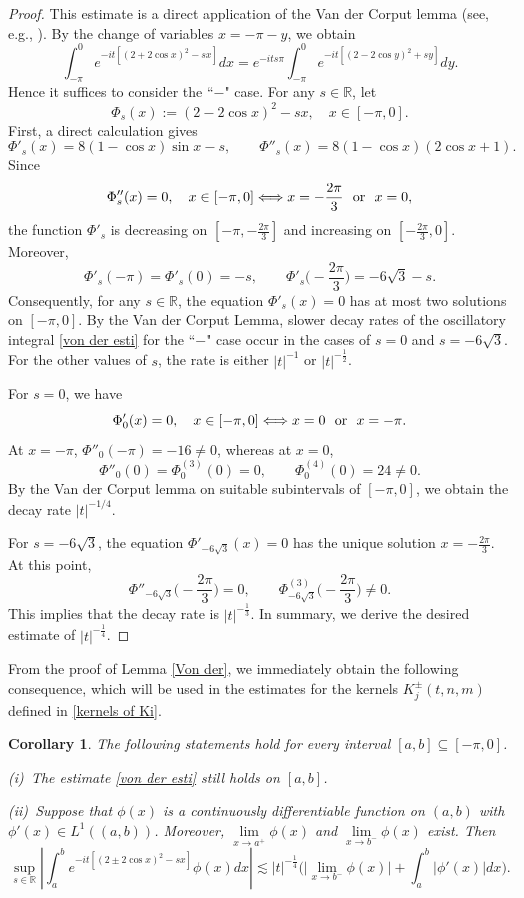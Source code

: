 \documentclass[reqno, 11pt]{amsart}
\newtheorem{corollary}[definition]{Corollary}
\newcommand\R{\mathbb{R}}
\numberwithin{equation}{section}
\begin{document}
\begin{proof}
This estimate is a direct application of the Van der Corput lemma (see, e.g., \cite[pp.~332--334]{Ste93}). By the change of variables $x=-\pi-y$, we obtain
$$\int_{-\pi}^{0}e^{-it[(2+2\cos x)^2-sx]}dx=e^{-its\pi}\int_{-\pi}^{0}e^{-it[(2-2\cos y)^2+sy]}dy.$$
Hence it suffices to consider the ``$-$" case. For any $s\in\R$, let $$\Phi_{s}(x):=(2-2\cos x)^2-sx,\quad x\in[-\pi,0].$$
First, a direct calculation gives
$$\Phi'_{s}(x)=8(1-\cos x)\sin x-s,\qquad \Phi''_{s}(x)=8(1-\cos x)(2\cos x+1).$$
Since 
$$\Phi''_{s}(x)=0,\quad x\in[-\pi,0]\Longleftrightarrow x=-\frac{2\pi}{3}\ \ {\rm or}\ \  x=0,$$
the function $\Phi'_s$ is decreasing on
$\left[-\pi,-\frac{2\pi}{3}\right]$ and increasing on
$\left[-\frac{2\pi}{3},0\right]$. Moreover, 
$$\Phi'_s(-\pi)=\Phi'_s(0)=-s, \qquad \Phi'_s\Big(-\frac{2\pi}{3}\Big)=-6\sqrt3-s.$$
Consequently, for any $s\in\R$, the equation $\Phi'_{s}(x)=0$ has at most two solutions on $[-\pi,0]$. By the Van der Corput Lemma, slower decay rates of the oscillatory integral \eqref{von der esti} for the ``$-$" case occur in the cases of $s=0$ and $s=-6\sqrt 3$. For the other values of $s$, the rate is either $|t|^{-1}$ or $|t|^{-\frac{1}{2}}$.

For $s=0$, we have $$\Phi'_{0}(x)=0,\quad x\in[-\pi,0]\Longleftrightarrow x=0\ \ {\rm or}\ \ x=-\pi.$$
At $x=-\pi$, $\Phi''_{0}(-\pi)=-16\neq0$, whereas at $x=0$,
$$\Phi''_{0}(0)=\Phi^{(3)}_{0}(0)=0,\qquad\Phi^{(4)}_{0}(0)=24\neq0.$$
By the
Van der Corput lemma on suitable subintervals of $[-\pi,0]$, we obtain
the decay rate $|t|^{-1/4}$.

For $s=-6\sqrt 3$, the equation $\Phi'_{-6\sqrt3}(x)=0$ has the unique
solution
$ x=-\frac{2\pi}{3}.$ At this point,
$$\Phi''_{-6\sqrt 3}\Big(-\frac{2\pi}{3}\Big)=0,\qquad\Phi^{(3)}_{-6\sqrt 3}\Big(-\frac{2\pi}{3}\Big)\neq0.$$
This implies that the decay rate is $|t|^{-\frac{1}{3}}$. In summary, we derive the desired estimate of $|t|^{-\frac{1}{4}}$.
\end{proof}
From the proof of Lemma \ref{Von der}, we immediately obtain the following consequence, which will be used in the estimates for the kernels $K_j^\pm(t,n,m)$ defined in \eqref{kernels of Ki}.
\begin{corollary}\label{corollary} 
The following statements hold for every interval $[a,b]\subseteq[-\pi,0]$.

 {\rm(i)}~The estimate \eqref{von der esti} still holds on $[a,b]$.

 {\rm(ii)}~Suppose that $\phi(x)$ is a continuously differentiable function on $(a,b)$ with $\phi'(x)\in L^{1}((a,b))$. Moreover, $\lim\limits_{x\rightarrow a^+}\phi(x)$ and $\lim\limits_{x\rightarrow b^-}\phi(x)$ exist. Then
\begin{equation}\label{von der esti complex}
\sup\limits_{s\in\R}\left|\int_{a}^{b}e^{-it\left[(2\pm2\cos x)^2-sx\right]}\phi(x)dx\right|\lesssim |t|^{-\frac{1}{4}}\Big(\big|\lim\limits_{x\rightarrow b^-}\phi(x)\big|+\int_{a}^{b}|\phi'(x)|dx\Big).
\end{equation}
\end{corollary}
\end{document}
